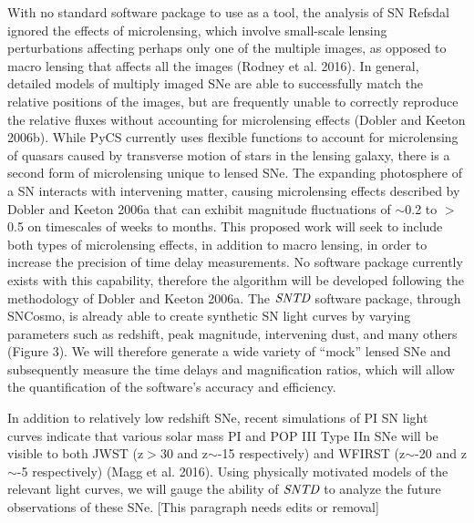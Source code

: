 With no standard software package to use as a tool, the analysis of SN Refsdal ignored the effects of microlensing, which involve small-scale lensing perturbations affecting perhaps only one of the multiple images, as opposed to macro lensing that affects all the images (Rodney et al. 2016). In general, detailed models of multiply imaged SNe are able to successfully match the relative positions of the images, but are frequently unable to correctly reproduce the relative fluxes without accounting for microlensing effects (Dobler and Keeton 2006b). While PyCS currently uses flexible functions to account for microlensing of quasars caused by transverse motion of stars in the lensing galaxy, there is a second form of microlensing unique to lensed SNe. The expanding photosphere of a SN interacts with intervening matter, causing microlensing effects described by Dobler and Keeton 2006a that can exhibit magnitude fluctuations of $\sim$0.2 to $>$0.5 on timescales of weeks to months. This proposed work will seek to include both types of microlensing effects, in addition to macro lensing, in order to increase the precision of time delay measurements. No software package currently exists with this capability, therefore the algorithm will be developed following the methodology of Dobler and Keeton 2006a. 
The $\textit{SNTD}$ software package, through SNCosmo, is already able to create synthetic SN light curves by varying parameters such as redshift, peak magnitude, intervening dust, and many others (Figure 3). We will therefore generate a wide variety of ``mock'' lensed SNe and subsequently measure the time delays and magnification ratios, which will allow the quantification of the software's accuracy and efficiency. 


In addition to relatively low redshift SNe, recent simulations of PI SN light curves indicate that various solar mass PI and POP III Type IIn SNe will be visible to both JWST (z$>$30 and z$\sim$-15 respectively) and WFIRST (z$\sim$-20 and z$\sim$-5 respectively) (Magg et al. 2016). Using physically motivated models of the relevant light curves, we will gauge the ability of $\textit{SNTD}$ to analyze the future observations of these SNe. [This paragraph needs edits or removal]


